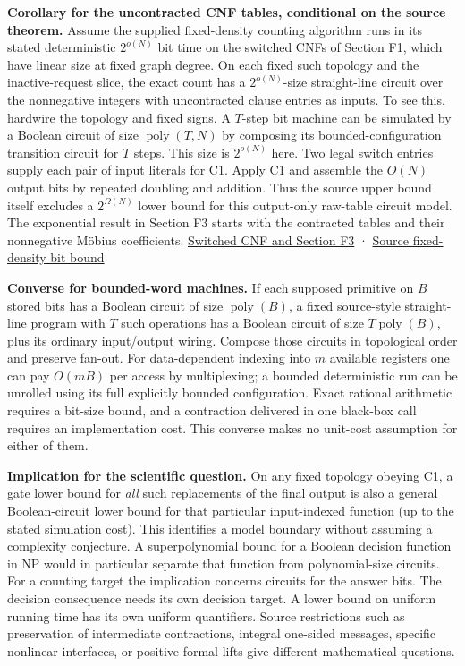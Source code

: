 \documentclass[11pt,a4paper]{article}
\begin{document}
\textbf{Corollary for the uncontracted CNF tables, conditional on the
source theorem.} Assume the supplied fixed-density counting algorithm
runs in its stated deterministic \(2^{o(N)}\) bit time on the switched
CNFs of Section F1, which have linear size at fixed graph degree. On
each fixed such topology and the inactive-request slice, the exact count
has a \(2^{o(N)}\)-size straight-line circuit over the nonnegative
integers with uncontracted clause entries as inputs. To see this,
hardwire the topology and fixed signs. A \(T\)-step bit machine can be
simulated by a Boolean circuit of size \(\operatorname{poly}(T,N)\) by
composing its bounded-configuration transition circuit for \(T\) steps.
This size is \(2^{o(N)}\) here. Two legal switch entries supply each
pair of input literals for C1. Apply C1 and assemble the \(O(N)\) output
bits by repeated doubling and addition. Thus the source upper bound
itself excludes a \(2^{\Omega(N)}\) lower bound for this output-only
raw-table circuit model. The exponential result in Section F3 starts
with the contracted tables and their nonnegative Möbius coefficients.
\hyperref[v8-section-stronger-family]{Switched CNF and Section F3} ·
\href{https://github.com/openai/math/blob/main/preprints/The-Exponential-Time-Hypothesis-is-False-October-25-2026/build/quantitative-reduction.tex\#L86}{Source
fixed-density bit bound}

\textbf{Converse for bounded-word machines.} If each supposed primitive
on \(B\) stored bits has a Boolean circuit of size
\(\operatorname{poly}(B)\), a fixed source-style straight-line program
with \(T\) such operations has a Boolean circuit of size
\(T\operatorname{poly}(B)\), plus its ordinary input/output wiring.
Compose those circuits in topological order and preserve fan-out. For
data-dependent indexing into \(m\) available registers one can pay
\(O(mB)\) per access by multiplexing; a bounded deterministic run can be
unrolled using its full explicitly bounded configuration. Exact rational
arithmetic requires a bit-size bound, and a contraction delivered in one
black-box call requires an implementation cost. This converse makes no
unit-cost assumption for either of them.

\textbf{Implication for the scientific question.} On any fixed topology
obeying C1, a gate lower bound for \emph{all} such replacements of the
final output is also a general Boolean-circuit lower bound for that
particular input-indexed function (up to the stated simulation cost).
This identifies a model boundary without assuming a complexity
conjecture. A superpolynomial bound for a Boolean decision function in
NP would in particular separate that function from polynomial-size
circuits. For a counting target the implication concerns circuits for
the answer bits. The decision consequence needs its own decision target.
A lower bound on uniform running time has its own uniform quantifiers.
Source restrictions such as preservation of intermediate contractions,
integral one-sided messages, specific nonlinear interfaces, or positive
formal lifts give different mathematical questions.
\end{document}
